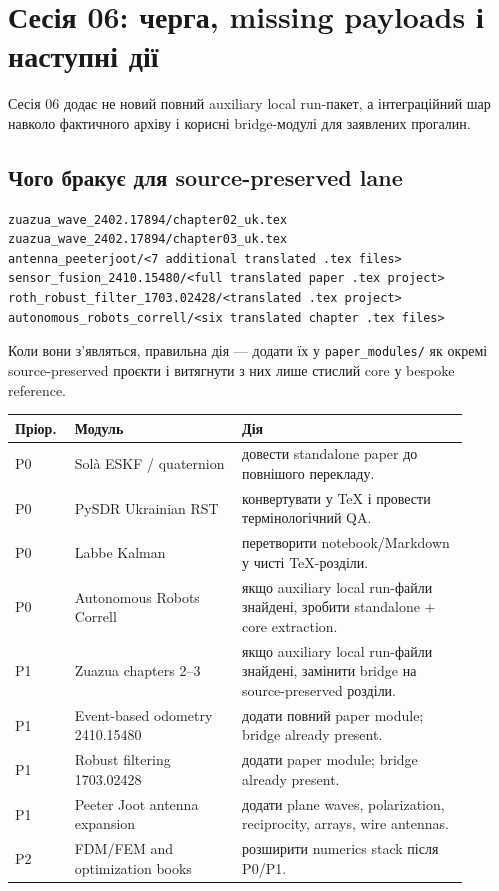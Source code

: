 \chapter{Сесія 06: черга, missing payloads і наступні дії}
\label{chap:session06-queue}

Сесія 06 додає не новий повний auxiliary local run-пакет, а інтеграційний шар навколо фактичного архіву і корисні bridge-модулі для заявлених прогалин.

\section{Чого бракує для source-preserved lane}

\begin{lstlisting}
zuazua_wave_2402.17894/chapter02_uk.tex
zuazua_wave_2402.17894/chapter03_uk.tex
antenna_peeterjoot/<7 additional translated .tex files>
sensor_fusion_2410.15480/<full translated paper .tex project>
roth_robust_filter_1703.02428/<translated .tex project>
autonomous_robots_correll/<six translated chapter .tex files>
\end{lstlisting}

Коли вони з'являться, правильна дія --- додати їх у \verb|paper_modules/| як окремі source-preserved проєкти і витягнути з них лише стислий core у bespoke reference.

\begin{longtable}{L{0.10\linewidth}L{0.34\linewidth}L{0.46\linewidth}}
\toprule
Пріор. & Модуль & Дія \\
\midrule
\endhead
P0 & Solà ESKF / quaternion & довести standalone paper до повнішого перекладу. \\
P0 & PySDR Ukrainian RST & конвертувати у TeX і провести термінологічний QA. \\
P0 & Labbe Kalman & перетворити notebook/Markdown у чисті TeX-розділи. \\
P0 & Autonomous Robots Correll & якщо auxiliary local run-файли знайдені, зробити standalone + core extraction. \\
P1 & Zuazua chapters 2--3 & якщо auxiliary local run-файли знайдені, замінити bridge на source-preserved розділи. \\
P1 & Event-based odometry 2410.15480 & додати повний paper module; bridge already present. \\
P1 & Robust filtering 1703.02428 & додати paper module; bridge already present. \\
P1 & Peeter Joot antenna expansion & додати plane waves, polarization, reciprocity, arrays, wire antennas. \\
P2 & FDM/FEM and optimization books & розширити numerics stack після P0/P1. \\
\bottomrule
\end{longtable}

